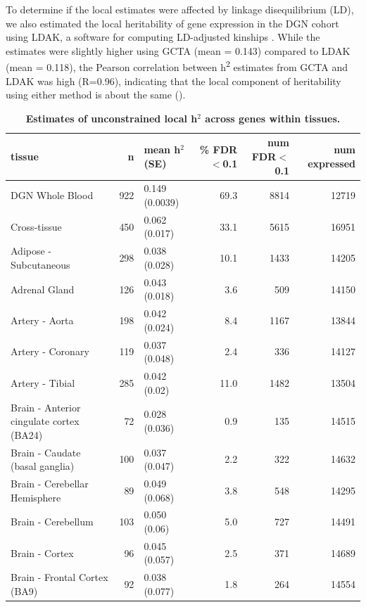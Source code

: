 \documentclass[10pt,letterpaper]{article}
\begin{document}
To determine if the local estimates were affected by linkage disequilibrium (LD), we also estimated the local heritability of gene expression in the DGN cohort using LDAK, a software for computing LD-adjusted kinships \cite{speed2012improved}. While the estimates were slightly higher using GCTA (mean = 0.143) compared to LDAK (mean = 0.118), the Pearson correlation between h\textsuperscript{2} estimates from GCTA and LDAK was high (R=0.96), indicating that the local component of heritability using either method is about the same ().

\begin{table}[!ht]
\begin{adjustwidth}{-2.25in}{0in} %
\caption{
{\bf Estimates of unconstrained local h$^2$ across genes within tissues.}}
\begin{tabular}{lrlrrr}
 \hline
tissue & n & mean h$^2$ (SE) & \% FDR$<$0.1 & num FDR$<$0.1 & num expressed \\ 
  \hline
DGN Whole Blood & 922 & 0.149 (0.0039) & 69.3 & 8814 & 12719 \\ 
  Cross-tissue & 450 & 0.062 (0.017) & 33.1 & 5615 & 16951 \\ 
  Adipose - Subcutaneous & 298 & 0.038 (0.028) & 10.1 & 1433 & 14205 \\ 
  Adrenal Gland & 126 & 0.043 (0.018) & 3.6 & 509 & 14150 \\ 
  Artery - Aorta & 198 & 0.042 (0.024) & 8.4 & 1167 & 13844 \\ 
  Artery - Coronary & 119 & 0.037 (0.048) & 2.4 & 336 & 14127 \\ 
  Artery - Tibial & 285 & 0.042 (0.02) & 11.0 & 1482 & 13504 \\ 
  Brain - Anterior cingulate cortex (BA24) & 72 & 0.028 (0.036) & 0.9 & 135 & 14515 \\ 
  Brain - Caudate (basal ganglia) & 100 & 0.037 (0.047) & 2.2 & 322 & 14632 \\ 
  Brain - Cerebellar Hemisphere & 89 & 0.049 (0.068) & 3.8 & 548 & 14295 \\ 
  Brain - Cerebellum & 103 & 0.050 (0.06) & 5.0 & 727 & 14491 \\ 
  Brain - Cortex & 96 & 0.045 (0.057) & 2.5 & 371 & 14689 \\ 
  Brain - Frontal Cortex (BA9) & 92 & 0.038 (0.077) & 1.8 & 264 & 14554 \\ 

\end{tabular}
\end{adjustwidth}
\end{table}
\end{document}
